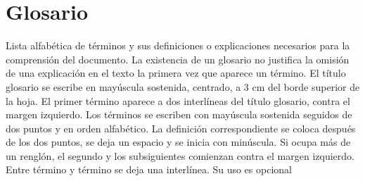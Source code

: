 
\chapter*{Glosario}

Lista alfabética de términos y sus definiciones o explicaciones necesarios para la comprensión del documento. La existencia de un glosario no justifica la omisión de una explicación en el texto la primera vez que aparece un término. El título glosario se escribe en mayúscula sostenida, centrado, a 3 cm del borde superior de la hoja.  El primer término aparece a dos interlíneas del título glosario, contra el margen izquierdo. Los términos se escriben con mayúscula sostenida seguidos de dos puntos y en orden alfabético. La definición correspondiente se coloca después de los dos puntos, se deja un espacio y se inicia con minúscula. Si ocupa más de un renglón, el segundo y los subsiguientes comienzan contra el margen izquierdo. Entre término y término se deja una interlínea. Su uso es opcional~\cite{NTC14862008}